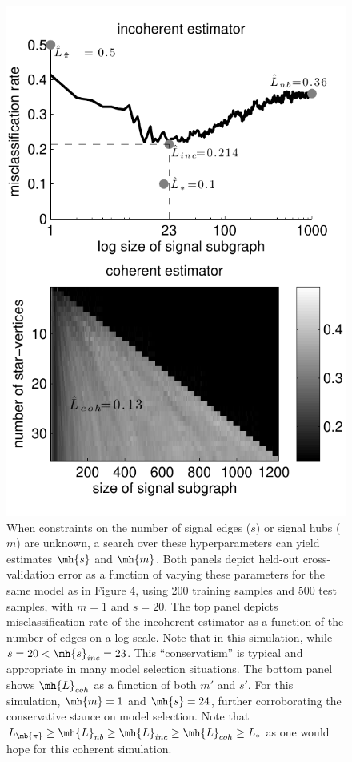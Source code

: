 \documentclass[10pt,journal,cspaper,compsoc]{IEEEtran}
\begin{document}
\begin{figure}[htbp]
	\centering
		\includegraphics[width=0.8\linewidth]{../figs/coherent_image_V70_s20_p10_q30_nTr200_nTe500.pdf}
	\caption{ When constraints on the number of signal edges ($s$) or signal hubs ($m$) are unknown, a search over these hyperparameters can yield estimates $\mh{s}$ and $\mh{m}$.  Both panels depict held-out cross-validation error as a function of varying these parameters for the same model as in Figure 4, using 200 training samples and 500 test samples, with $m=1$ and $s=20$.  The top panel depicts misclassification rate of the incoherent estimator as a function of the number of edges on a log scale. Note that in this simulation, while $s=20< \mh{s}_{inc}=23$.  This ``conservatism'' is typical and appropriate in many model selection situations.  The bottom panel shows $\mh{L}_{coh}$ as a function of both $m'$ and $s'$.  For this simulation, $\mh{m}=1$ and $\mh{s}=24$, further corroborating the conservative stance on model selection. Note that $L_{\mb{\pi}} \geq \mh{L}_{nb} \geq \mh{L}_{inc} \geq \mh{L}_{coh} \geq L_*$ as one would hope for this coherent simulation.}
	\label{fig:coherent}
\end{figure}
\end{document}
